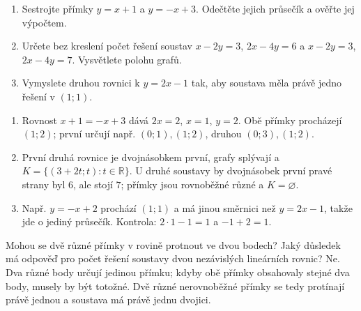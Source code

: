 \documentclass[11pt,a4paper]{article}
\begin{document}
\begin{center}
\end{center}
\begin{zadaniReseniBox}
\begin{enumerate}[label=\alph*)]
\item Sestrojte přímky $y=x+1$ a $y=-x+3$. Odečtěte jejich průsečík a ověřte jej výpočtem.
\item Určete bez kreslení počet řešení soustav $x-2y=3$, $2x-4y=6$ a $x-2y=3$, $2x-4y=7$. Vysvětlete polohu grafů.
\item Vymyslete druhou rovnici k $y=2x-1$ tak, aby soustava měla právě jedno řešení v $(1;1)$.
\end{enumerate}
\tcblower
\begin{enumerate}[label=\alph*)]
\item Rovnost $x+1=-x+3$ dává $2x=2$, $x=1$, $y=2$. Obě přímky procházejí $(1;2)$; první určují např. $(0;1),(1;2)$, druhou $(0;3),(1;2)$.
\item První druhá rovnice je dvojnásobkem první, grafy splývají a $K=\{(3+2t;t):t\in\mathbb R\}$. U druhé soustavy by dvojnásobek první pravé strany byl $6$, ale stojí $7$; přímky jsou rovnoběžné různé a $K=\varnothing$.
\item Např. $y=-x+2$ prochází $(1;1)$ a má jinou směrnici než $y=2x-1$, takže jde o jediný průsečík. Kontrola: $2\cdot1-1=1$ a $-1+2=1$.
\end{enumerate}
\end{zadaniReseniBox}
\newpage
{}
\begin{zadaniReseniBox}
Mohou se dvě různé přímky v rovině protnout ve dvou bodech? Jaký důsledek má odpověď pro počet řešení soustavy dvou nezávislých lineárních rovnic?
\tcblower
Ne. Dva různé body určují jedinou přímku; kdyby obě přímky obsahovaly stejné dva body, musely by být totožné. Dvě různé nerovnoběžné přímky se tedy protínají právě jednou a soustava má právě jednu dvojici.
\end{zadaniReseniBox}
\end{document}
